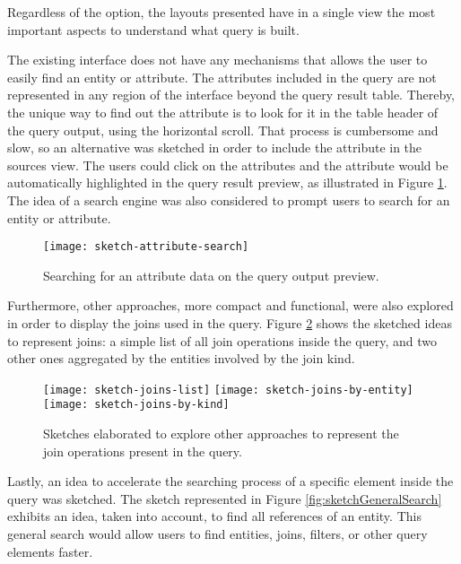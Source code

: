 Regardless of the option, the layouts presented have in a single view the most important aspects to understand what query is built.

The existing interface does not have any mechanisms that allows the user to easily find an entity or attribute. The attributes included in the query are not represented in any region of the interface beyond the query result table. Thereby, the unique way to find out the attribute is to look for it in the table header of the query output, using the horizontal scroll. That process is cumbersome and slow, so an alternative was sketched in order to include the attribute in the sources view. The users could click on the attributes and the attribute would be automatically highlighted in the query result preview, as illustrated in Figure \ref{fig:sketchAttributeSearch}. The idea of a search engine was also considered to prompt users to search for an entity or attribute.

\begin{figure}[htbp]
	\centering
	\texttt{[image: sketch-attribute-search]}
	\caption{Searching for an attribute data on the query output preview.}
	\label{fig:sketchAttributeSearch}
\end{figure}

Furthermore, other approaches, more compact and functional, were also explored in order to display the joins used in the query. Figure \ref{fig:sketchJoins} shows the sketched ideas to represent joins: a simple list of all join operations inside the query, and two other ones aggregated by the entities involved by the join kind.

\begin{figure}[tb]
  \centering
    {\texttt{[image: sketch-joins-list]}}%
  {\texttt{[image: sketch-joins-by-entity]}}%
  {\texttt{[image: sketch-joins-by-kind]}}%
\caption{Sketches elaborated to explore other approaches to represent the join operations present in the query.}
  \label{fig:sketchJoins}
\end{figure}

Lastly, an idea to accelerate the searching process of a specific element inside the query was sketched. The sketch represented in Figure \ref{fig:sketchGeneralSearch} exhibits an idea, taken into account, to find all references of an entity. This general search would allow users to find entities, joins, filters, or other query elements faster.

